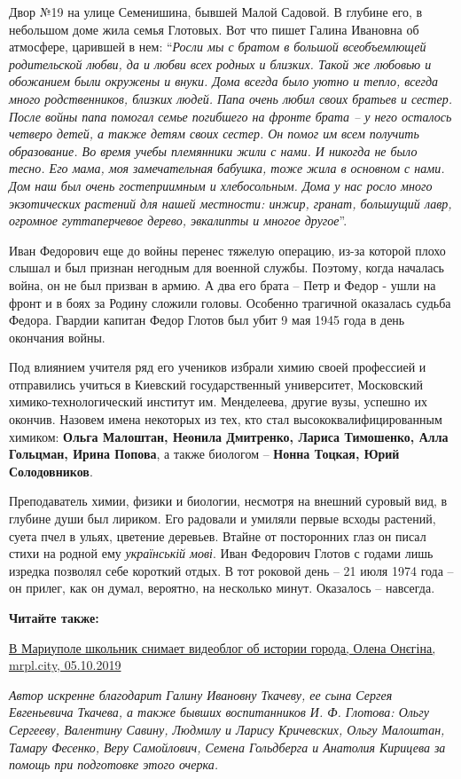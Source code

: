 Двор №19 на улице Семенишина, бывшей Малой Садовой. В глубине его, в небольшом
доме жила семья Глотовых. Вот что пишет Галина Ивановна об атмосфере, царившей
в нем: \enquote{\em Росли мы с братом в большой всеобъемлющей родительской любви, да и
любви всех родных и близких. Такой же любовью и обожанием были окружены и
внуки. Дома всегда было уютно и тепло, всегда много родственников, близких
людей. Папа очень любил своих братьев и сестер. После войны папа помогал семье
погибшего на фронте брата – у него осталось четверо детей, а также детям своих
сестер. Он помог им всем получить образование. Во время учебы племянники жили с
нами. И никогда не было тесно. Его мама, моя замечательная бабушка, тоже жила в
основном с нами. Дом наш был очень гостеприимным и хлебосольным. Дома у нас
росло много экзотических растений для нашей местности: инжир, гранат, большущий
лавр, огромное гуттаперчевое дерево, эвкалипты и многое другое}.

Иван Федорович еще до войны перенес тяжелую операцию, из-за которой плохо
слышал и был признан негодным для военной службы. Поэтому, когда началась
война, он не был призван в армию. А два его брата – Петр и Федор - ушли на
фронт и в боях за Родину сложили головы. Особенно трагичной оказалась судьба
Федора. Гвардии капитан Федор Глотов был убит 9 мая 1945 года в день окончания
войны.

Под влиянием учителя ряд его учеников избрали химию своей профессией и
отправились учиться в Киевский государственный университет, Московский
химико-технологический институт им. Менделеева, другие вузы, успешно их
окончив. Назовем имена некоторых из тех, кто стал высококвалифицированным
химиком: \textbf{Ольга Малоштан, Неонила Дмитренко, Лариса Тимошенко, Алла Гольцман,
Ирина Попова}, а также биологом – \textbf{Нонна Тоцкая, Юрий Солодовников}.

Преподаватель химии, физики и биологии, несмотря на внешний суровый вид, в
глубине души был лириком. Его радовали и умиляли первые всходы растений, суета
пчел в ульях, цветение деревьев. Втайне от посторонних глаз он писал стихи на
родной ему \emph{українській мові}. Иван Федорович Глотов с годами лишь изредка
позволял себе короткий отдых. В тот роковой день – 21 июля 1974 года – он
прилег, как он думал, вероятно, на несколько минут. Оказалось – навсегда.

\textbf{Читайте также:} 

\href{Читайте также: В Мариуполе школьник снимает видеоблог об истории города}{%
В Мариуполе школьник снимает видеоблог об истории города, Олена Онєгіна, mrpl.city, 05.10.2019}

\emph{Автор искренне благодарит Галину Ивановну Ткачеву, ее сына Сергея Евгеньевича
Ткачева, а также бывших воспитанников И. Ф. Глотова: Ольгу Сергееву, Валентину
Савину, Людмилу и Ларису Кричевских, Ольгу Малоштан, Тамару Фесенко, Веру
Самойлович, Семена Гольдберга и Анатолия Кирицева за помощь при подготовке
этого очерка.}
